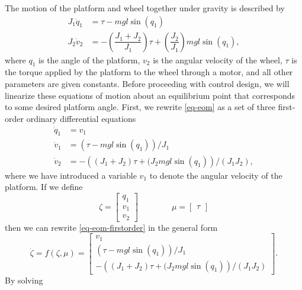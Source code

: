 \documentclass[conf]{new-aiaa}
\begin{document}
The motion of the platform and wheel together under gravity is described by
\begin{equation}
\begin{aligned}
J_1 \ddot{q}_1 &= \tau - mgl\sin(q_1) \\
J_2 \dot{v}_2 &= - \left( \dfrac{J_1 + J_2}{J_1} \right) \tau + \left( \dfrac{J_2}{J_1} \right) mgl\sin(q_1),
\end{aligned}
\label{eq-eom}
\end{equation}
where $q_{1}$ is the angle of the platform, $v_{2}$ is the angular velocity of the wheel, $\tau$ is the torque applied by the platform to the wheel through a motor, and all other parameters are given constants.
Before proceeding with control design, we will linearize these equations of motion about an equilibrium point that corresponds to some desired platform angle.
First, we rewrite \eqref{eq-eom} as a set of three first-order ordinary differential equations
\begin{equation}
\begin{aligned}
\dot{q}_{1} &= v_{1} \\
\dot{v}_{1} &= \left( \tau - mgl\sin(q_1) \right) / J_{1} \\
\dot{v}_{2} &= - \left( (J_1 + J_2) \tau + ( J_{2} mgl\sin(q_1) \right) / (J_{1}J_{2}),
\end{aligned}
\label{eq-eom-firstorder}
\end{equation}
where we have introduced a variable $v_{1}$ to denote the angular velocity of the platform. If we define
\begin{equation}
\zeta = \begin{bmatrix} q_{1} \\ v_{1} \\ v_{2} \end{bmatrix}
\qquad\qquad
\mu = \begin{bmatrix} \tau \end{bmatrix}
\end{equation}
then we can rewrite \eqref{eq-eom-firstorder} in the general form
\begin{equation}
\dot{\zeta} = f(\zeta, \mu) =
\begin{bmatrix}
v_{1} \\
\left( \tau - mgl\sin(q_1) \right) / J_{1} \\
- \left( (J_1 + J_2) \tau + ( J_{2} mgl\sin(q_1) \right) / (J_{1}J_{2})
\end{bmatrix}.
\label{eq-eom-general}
\end{equation}
By solving
\end{document}
